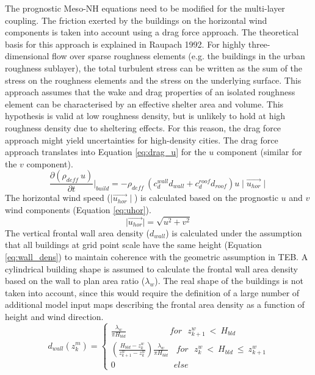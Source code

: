 %
The prognostic Meso-NH equations need to be modified for the multi-layer coupling.
The friction exerted by the buildings on the horizontal wind components is taken into account using a drag force approach.
The theoretical basis for this approach is explained in Raupach 1992. For highly three-dimensional flow over sparse
roughness elements (e.g. the buildings in the urban roughness sublayer), the total turbulent stress can be written as
the sum of the stress on the roughness elements and the stress on the underlying surface. This approach assumes that
the wake and drag properties of an isolated roughness element can be characterised by an effective shelter area and volume.
This hypothesis is valid at low roughness density, but is unlikely to hold at high roughness density due to sheltering effects.
For this reason, the drag force approach might yield uncertainties for high-density cities. The drag force approach
translates into Equation \ref{eq:drag_u} for the $u$ component (similar for the $v$ component).
%
\begin{equation}
\label{eq:drag_u}
{\frac{\partial (\rho_{deff} \ u)}{\partial t}} \bigg\vert_{build} = - \rho_{deff} \ \left(c_{d}^{wall}d_{wall} + c_{d}^{roof}d_{roof} 
\right) u \mid \vec{u_{hor}} \mid
\end{equation}
%
The horizontal wind speed ($\mid \vec{u_{hor}} \mid$) is calculated based on the prognostic 
$u$ and $v$ wind components (Equation \ref{eq:uhor}).
%
\begin{equation}
\label{eq:uhor}
\mid \vec{u_{hor}} \mid = \sqrt{u^2+v^2}
\end{equation}
%
The vertical frontal wall area density ($d_{wall}$) is calculated under the assumption
that all buildings at grid point scale have the same height (Equation \ref{eq:wall_dens})
to maintain coherence with the geometric assumption in TEB. A cylindrical building shape
is assumed to calculate the frontal wall area density based on the wall to plan area ratio
($\lambda_{w}$). The real shape of the buildings is not taken into account, since this would
require the definition of a large number of additional model input maps describing the
frontal area density as a function of height and wind direction.
%
\begin{equation}
\label{eq:wall_dens}
d_{wall}(z^{m}_{k})= 
\begin{cases}
\frac{\lambda_{w}}{\pi H_{bld}} \ \ \ \ \ \ \ \ \ \ \ \ \ \ \ \ \ \ \ \ \ \ \ for \ \ \ z^{w}_{k+1} \ < \ H_{bld} \\
\left( \frac{H_{bld} - z^{w}_{k}}{z^{w}_{k+1}-z^{w}_{k}} \right) \frac{\lambda_{w}}{\pi H_{bld}} \ \ \ \ for \ \ \ z^{w}_{k} \ < \ H_{bld} \ 
\leq \ z^{w}_{k+1} \\
0 \ \ \ \ \ \ \ \ \ \ \ \ \ \ \ \ \ \ \ \ \ \ \ \ \ \ \ \ \ \ \ else
\end{cases}
\end{equation}
